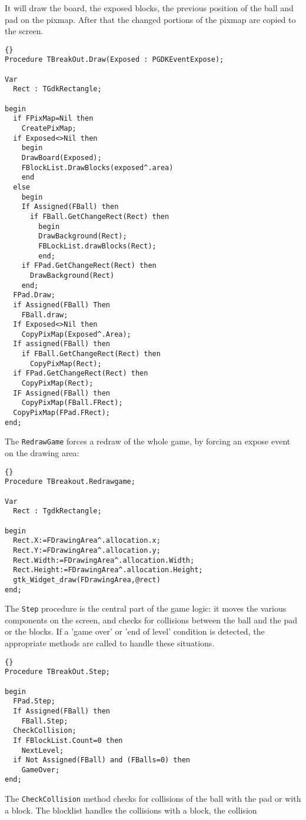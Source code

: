 \documentclass[10pt]{article}
\newcommand{\var}[1]{\texttt{#1}}
\begin{document}
It will draw the board, the exposed blocks, the previous position of
the ball and pad on the pixmap. After that the changed portions of
the pixmap are copied to the screen.
\begin{lstlisting}{}
Procedure TBreakOut.Draw(Exposed : PGDKEventExpose);

Var
  Rect : TGdkRectangle;

begin
  if FPixMap=Nil then 
    CreatePixMap;
  if Exposed<>Nil then
    begin
    DrawBoard(Exposed);
    FBlockList.DrawBlocks(exposed^.area)
    end
  else
    begin
    If Assigned(FBall) then 
      if FBall.GetChangeRect(Rect) then
        begin
        DrawBackground(Rect);
        FBLockList.drawBlocks(Rect);
        end;  
    if FPad.GetChangeRect(Rect) then
      DrawBackground(Rect)
    end;
  FPad.Draw;
  if Assigned(FBall) Then
    FBall.draw;
  If Exposed<>Nil then
    CopyPixMap(Exposed^.Area);
  If assigned(FBall) then
    if FBall.GetChangeRect(Rect) then
      CopyPixMap(Rect);
  if FPad.GetChangeRect(Rect) then
    CopyPixMap(Rect);
  IF Assigned(FBall) then
    CopyPixMap(FBall.FRect);
  CopyPixMap(FPad.FRect);
end;
\end{lstlisting}
The \var{RedrawGame} forces a redraw of the whole game, by forcing an expose event on the 
drawing area:
\begin{lstlisting}{}
Procedure TBreakout.Redrawgame;

Var
  Rect : TgdkRectangle;

begin
  Rect.X:=FDrawingArea^.allocation.x;
  Rect.Y:=FDrawingArea^.allocation.y;
  Rect.Width:=FDrawingArea^.allocation.Width;
  Rect.Height:=FDrawingArea^.allocation.Height;
  gtk_Widget_draw(FDrawingArea,@rect)
end;
\end{lstlisting}
The \var{Step} procedure is the central part of the game logic: it moves
the various components on the screen, and checks for collisions between 
the ball and the pad or the blocks. If a 'game over' or 'end of level' 
condition is detected, the appropriate methods are called to handle 
these situations.
\begin{lstlisting}{}
Procedure TBreakOut.Step;

begin
  FPad.Step;
  If Assigned(FBall) then
    FBall.Step;
  CheckCollision;
  If FBlockList.Count=0 then
    NextLevel;
  if Not Assigned(FBall) and (FBalls=0) then
    GameOver;
end;
\end{lstlisting}
The \var{CheckCollision} method checks for collisions of the ball with the pad
or with a block. The blocklist handles the collisions with a block, the collision
\end{document}
